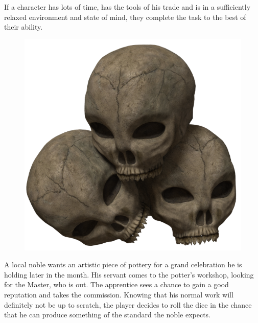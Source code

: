 If a character has lots of time, has the tools of his trade and is in a sufficiently relaxed environment and state of mind, they complete the task to the best of their ability. 


\begin{figure}[h]
\begin{center}
\includegraphics[scale=0.13]{img/SkullPile.png}
\end{center}
\end{figure}

\begin{rpg-examplebox}
A local noble wants an artistic piece of pottery for a grand celebration he is holding later in the month. His servant comes to the potter’s workshop, looking for the Master, who is out. The apprentice sees a chance to gain a good reputation and takes the commission. Knowing that his normal work will definitely not be up to scratch, the player decides to roll the dice in the chance that he can produce something of the standard the noble expects.
\end{rpg-examplebox}

